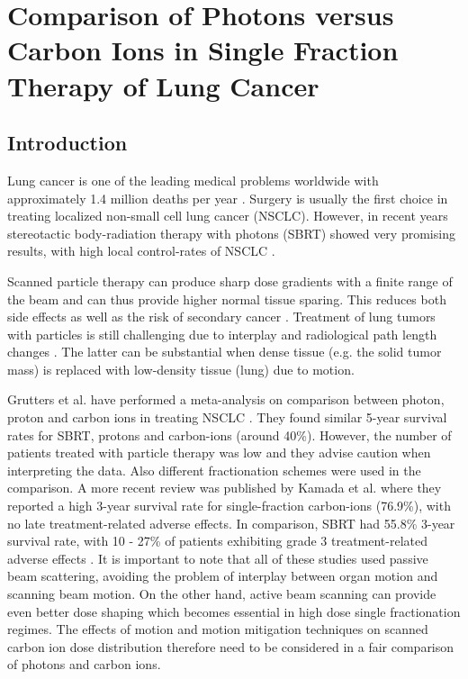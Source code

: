 \chapter{Comparison of Photons versus Carbon Ions in Single Fraction Therapy of Lung Cancer}
\label{PatStudy}


\section{Introduction}

Lung cancer is one of the leading medical problems worldwide with approximately 1.4 million deaths per year \cite{Siegel2014}. Surgery is usually the first choice in treating localized non-small cell lung cancer (NSCLC). However, in recent years stereotactic body-radiation therapy with photons (SBRT) showed very promising results, with high local control-rates of NSCLC \cite{Baumann2009, Fakiris2009, Grutters2010, Ricardi2010, Timmerman2010, Greco2011}.

Scanned particle therapy can produce sharp dose gradients with a finite range of the beam and can thus provide higher normal tissue sparing. This reduces both side effects as well as the risk of secondary cancer \cite{Newhauser2011}. Treatment of lung tumors with particles is still challenging due to interplay and radiological path length changes \cite{Bert2011}.
The latter can be substantial when dense tissue (e.g. the solid tumor mass) is replaced with low-density tissue (lung) due to motion.

Grutters et al. have performed a meta-analysis on comparison between photon, proton and carbon ions in treating NSCLC \cite{Grutters2010}.
They found similar 5-year survival rates for SBRT, protons and carbon-ions (around 40\%). However, the number of patients treated with
particle therapy was low and they advise caution when interpreting the data. Also different fractionation schemes were used in the
comparison. A more recent review was published by  Kamada et al. \cite{Kamada2016} where they reported a high 3-year survival rate for
single-fraction carbon-ions (76.9\%), with no late treatment-related adverse effects. In comparison, SBRT had 55.8\% 3-year survival rate,
with 10 - 27\% of patients exhibiting grade 3 treatment-related adverse effects \cite{Timmerman2010}. It is important to note that all
of these studies used passive beam scattering, avoiding the problem of interplay between organ motion and scanning beam motion.
On the other hand, active beam scanning can provide even better dose shaping which becomes essential in high dose single fractionation
regimes. The effects of motion and motion mitigation techniques on scanned carbon ion dose distribution therefore need to be considered 
in a fair comparison of photons and carbon ions. 

